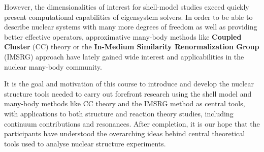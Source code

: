 \documentclass{beamer}
\begin{document}
\begin{frame}
\begin{block}{}
However, the dimensionalities of interest for shell-model studies
exceed quickly present computational capabilities of eigensystem
solvers. In order to be able to describe nuclear systems with many
more degrees of freedom as well as providing better effective
operators, approximative many-body methods like \textbf{Coupled Cluster} (CC) theory
or the \textbf{In-Medium Similarity Renormalization Group} (IMSRG) approach have lately
gained wide interest and applicabilities in the nuclear many-body
community.

It is the goal and motivation of this
course to introduce and develop the nuclear structure tools needed to
carry out forefront research using the shell model and many-body
methods like CC theory and the IMSRG method as central tools, with applications to both structure and reaction theory studies, including continuum contributions and resonances.  After completion, it is our
hope that the participants have understood the overarching ideas
behind central theoretical tools used to analyse nuclear structure
experiments.

\end{block}
\end{frame}
\end{document}
